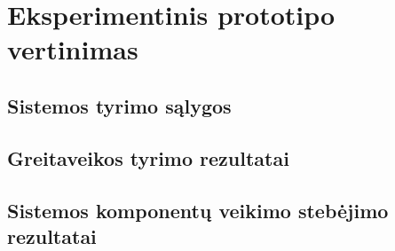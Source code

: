 \section{Eksperimentinis prototipo vertinimas}
\subsection{Sistemos tyrimo sąlygos}
\subsection{Greitaveikos tyrimo rezultatai}
\subsection{Sistemos komponentų veikimo stebėjimo rezultatai}